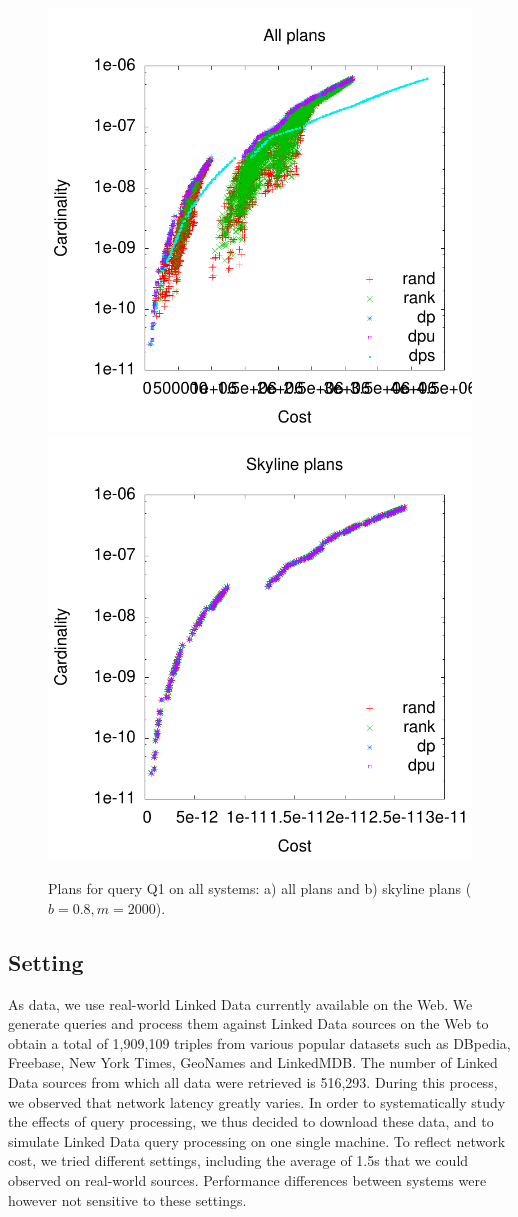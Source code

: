 \begin{figure}[htb]
  \vspace{-0.1cm}
  \centering
  \includegraphics[width=0.48\linewidth]{figs/plans_q2_all.pdf}
  \includegraphics[width=0.48\linewidth]{figs/plans_q2_sky.pdf}
  \caption{Plans for query Q1 on all systems: a) all plans and b)
    skyline plans ($b=0.8,m=2000$).}
  \label{fig:pareto_q2_skyline}
  \vspace{-0.5cm}
\end{figure}

\subsection{Setting} As data, we use real-world Linked Data currently available on the Web. We generate queries and process them against Linked Data sources on the Web to obtain a total of 1,909,109 triples from various popular datasets such as DBpedia, Freebase, New York Times, GeoNames and LinkedMDB. The number of Linked Data sources from which all data were retrieved is 516,293. During this process, we observed that network latency greatly varies. In order to systematically study the effects of query processing, we thus decided to download these data, and to simulate Linked Data query processing on one single machine. To reflect network cost, we tried different settings, including the average of 1.5s that we could observed on real-world sources. Performance differences between systems were however not sensitive to these settings. 

